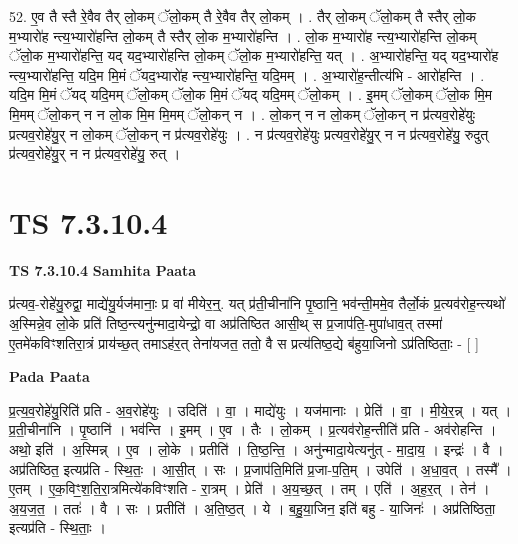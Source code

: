 \documentclass[17pt]{extarticle}
\begin{document}
52. ए॒व तै स्तै रे॒वैव तैर् लो॒कम् ॅलो॒कम् तै रे॒वैव तैर् लो॒कम् । . तैर् लो॒कम् ॅलो॒कम् तै स्तैर् लो॒क म॒भ्यारो॑ह न्त्य॒भ्यारो॑हन्ति लो॒कम् तै स्तैर् लो॒क म॒भ्यारो॑हन्ति । . लो॒क म॒भ्यारो॑ह न्त्य॒भ्यारो॑हन्ति लो॒कम् ॅलो॒क म॒भ्यारो॑हन्ति॒ यद् यद॒भ्यारो॑हन्ति लो॒कम् ॅलो॒क म॒भ्यारो॑हन्ति॒ यत् । . अ॒भ्यारो॑हन्ति॒ यद् यद॒भ्यारो॑ह न्त्य॒भ्यारो॑हन्ति॒ यदि॒म मि॒मं ॅयद॒भ्यारो॑ह न्त्य॒भ्यारो॑हन्ति॒ यदि॒मम् । . अ॒भ्यारो॑ह॒न्तीत्य॑भि - आरो॑हन्ति । . यदि॒म मि॒मं ॅयद् यदि॒मम् ॅलो॒कम् ॅलो॒क मि॒मं ॅयद् यदि॒मम् ॅलो॒कम् । . इ॒मम् ॅलो॒कम् ॅलो॒क मि॒म मि॒मम् ॅलो॒कन् न न लो॒क मि॒म मि॒मम् ॅलो॒कन् न । . लो॒कन् न न लो॒कम् ॅलो॒कन् न प्र॑त्यव॒रोहे॑युः प्रत्यव॒रोहे॑यु॒र् न लो॒कम् ॅलो॒कन् न प्र॑त्यव॒रोहे॑युः । . न प्र॑त्यव॒रोहे॑युः प्रत्यव॒रोहे॑यु॒र् न न प्र॑त्यव॒रोहे॑यु॒ रुदुत् प्र॑त्यव॒रोहे॑यु॒र् न न प्र॑त्यव॒रोहे॑यु॒ रुत् । \newline
\pagebreak
{}

\section{ TS 7.3.10.4 }

\textbf{TS 7.3.10.4 } \newline
\textbf{Samhita Paata} \newline

प्र॑त्यव॒-रोहे॑यु॒रुद्वा॒ माद्ये॑यु॒र्यज॑मानाः॒ प्र वा॑ मीयेर॒न्॒. यत् प्र॑ती॒चीना॑नि पृ॒ष्ठानि॒ भव॑न्ती॒ममे॒व तैर्लो॒कं प्र॒त्यव॑रोह॒न्त्यथो॑ अ॒स्मिन्ने॒व लो॒के प्रति॑ तिष्ठ॒न्त्यनु॑न्मादा॒येन्द्रो॒ वा अप्र॑तिष्ठित आसी॒थ् स प्र॒जाप॑ति॒-मुपा॑धाव॒त् तस्मा॑ ए॒तमे॑कविꣳशतिरा॒त्रं प्राय॑च्छ॒त् तमाऽह॑र॒त् तेना॑यजत॒ ततो॒ वै स प्रत्य॑तिष्ठ॒द्ये ब॑हुया॒जिनो ऽप्र॑तिष्ठिताः॒ - [  ] \newline

\textbf{Pada Paata} \newline

प्र॒त्य॒व॒रोहे॑यु॒रिति॑ प्रति - अ॒व॒रोहे॑युः । उदिति॑ । वा॒ । माद्ये॑युः । यज॑मानाः । प्रेति॑ । वा॒ । मी॒ये॒र॒न्न् । यत् । प्र॒ती॒चीना॑नि । पृ॒ष्ठानि॑ । भव॑न्ति । इ॒मम् । ए॒व । तैः । लो॒कम् । प्र॒त्यव॑रोह॒न्तीति॑ प्रति - अव॑रोहन्ति । अथो॒ इति॑ । अ॒स्मिन्न् । ए॒व । लो॒के । प्रतीति॑ । ति॒ष्ठ॒न्ति॒ । अनु॑न्मादा॒येत्यनु॑त् - मा॒दा॒य॒ । इन्द्रः॑ । वै । अप्र॑तिष्ठित॒ इत्यप्र॑ति - स्थि॒तः॒ । आ॒सी॒त् । सः । प्र॒जाप॑ति॒मिति॑ प्र॒जा-प॒ति॒म् । उपेति॑ । अ॒धा॒व॒त् । तस्मै᳚ । ए॒तम् । ए॒क॒विꣳ॒॒श॒ति॒रा॒त्रमित्ये॑कविꣳशति - रा॒त्रम् । प्रेति॑ । अ॒य॒च्छ॒त् । तम् । एति॑ । अ॒ह॒र॒त् । तेन॑ । अ॒य॒ज॒त॒ । ततः॑ । वै । सः । प्रतीति॑ । अ॒ति॒ष्ठ॒त् । ये । ब॒हु॒या॒जिन॒ इति॑ बहु - या॒जिनः॑ । अप्र॑तिष्ठिता॒ इत्यप्र॑ति - स्थि॒ताः॒ ।  \newline
\end{document}
